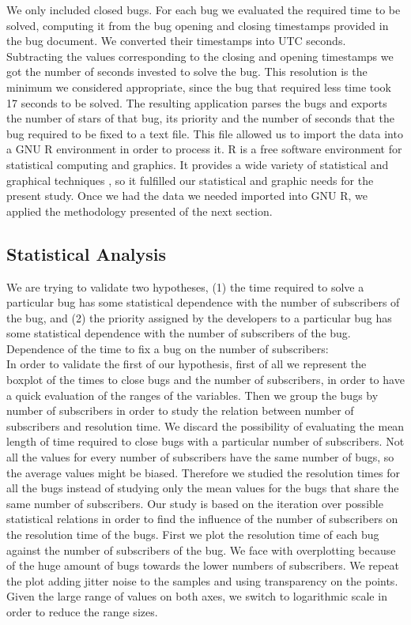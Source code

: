 \documentclass[10pt, conference, compsocconf]{IEEEtran}
\begin{document}
We only included closed bugs. For each bug we evaluated the required time to be solved, computing it from the bug opening and closing timestamps provided in the bug document. We converted their timestamps into UTC seconds. Subtracting the values corresponding to the closing and opening timestamps we got the number of seconds invested to solve the bug. This resolution is the minimum we considered appropriate, since the bug that required less time took 17 seconds to be solved. The resulting application parses the bugs and exports the number of stars of that bug, its priority and the number of seconds that the bug required to be fixed to a text file. This file allowed us to import the data into a GNU R environment in order to process it. R is a free software environment for statistical computing and graphics. It provides a wide variety of statistical and graphical techniques  \cite{WhatIsR}, so it fulfilled our statistical and graphic needs for the present study. Once we had the data we needed imported into GNU R, we applied the methodology presented of the next section.

\subsection {Statistical Analysis}
We are trying to validate two hypotheses, (1) the time required to solve a particular bug has some statistical dependence with the number of subscribers of the bug, and (2) the priority assigned by the developers to a particular bug has some statistical dependence with the number of subscribers of the bug.
\\
Dependence of the time to fix a bug on the number of subscribers:
\\
In order to validate the first of our hypothesis, first of all we represent the boxplot of the times to close  bugs and the number of subscribers, in order to have a quick evaluation of the ranges of the variables. Then we group the bugs by number of subscribers in order to study the relation between number of subscribers and resolution time. We discard the possibility of evaluating the mean length of time required to close bugs with a particular number of subscribers. Not all the values for every number of subscribers have the same number of bugs, so the average values might be biased. Therefore we studied the resolution times for all the bugs instead of studying only the mean values for the bugs that share the same number of subscribers.
Our study is based on the iteration over possible statistical relations in order to find the influence of the number of subscribers on the resolution time of the bugs. First we plot the resolution time of each bug against the number of subscribers of the bug. We face with overplotting because of the huge amount of bugs towards the lower numbers of subscribers. We repeat the plot adding jitter noise to the samples and using transparency on the points. Given the large range of values on both axes, we switch to logarithmic scale in order to reduce the range sizes.
\end{document}
